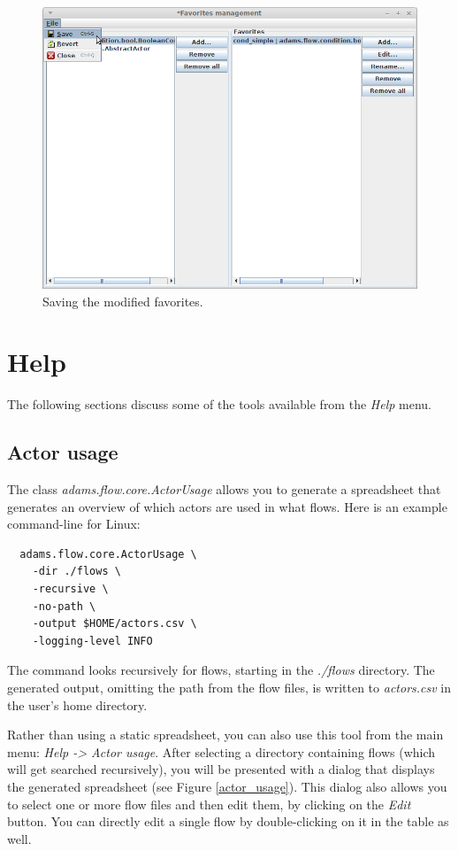 \begin{figure}[htb]
  \centering
  \includegraphics[width=12.0cm]{images/favoritesmanagement-save.png}
  \caption{Saving the modified favorites.}
  \label{favoritesmanagement-save}
\end{figure}


\chapter{Help}
The following sections discuss some of the tools available from the \textit{Help}
menu.

\section{Actor usage}
The class \textit{adams.flow.core.ActorUsage} allows you to generate a spreadsheet
that generates an overview of which actors are used in what flows. Here is an example
command-line for Linux:
\begin{verbatim}
  adams.flow.core.ActorUsage \
    -dir ./flows \
    -recursive \
    -no-path \
    -output $HOME/actors.csv \
    -logging-level INFO
\end{verbatim}
The command looks recursively for flows, starting in the \textit{./flows}
directory. The generated output, omitting the path from the flow files, is
written to \textit{actors.csv} in the user's home directory.

Rather than using a static spreadsheet, you can also use this tool from the
main menu: \textit{Help -> Actor usage}. After selecting a directory containing
flows (which will get searched recursively), you will be presented with a dialog
that displays the generated spreadsheet (see Figure \ref{actor_usage}). This
dialog also allows you to select one or more flow files and then edit them,
by clicking on the \textit{Edit} button. You can directly edit a single flow
by double-clicking on it in the table as well.

